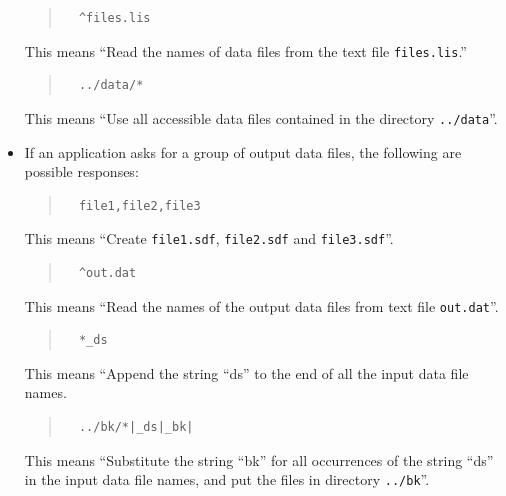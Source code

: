 \documentclass[twoside,11pt]{article}
\renewcommand{\_}{\texttt{\symbol{95}}}
\newenvironment{myquote}{\begin{quote}\begin{small}}{\end{small}\end{quote}}
\begin{document}
\begin{itemize}
\begin{myquote}
\begin{verbatim}
  ^files.lis
\end{verbatim}
\end{myquote}
\vspace{-3mm}
This means ``Read the names of data files from the text file
\verb+files.lis+.''

\begin{myquote}
\begin{verbatim}
  ../data/*
\end{verbatim}
\end{myquote}
\vspace{-3mm}
This means ``Use all accessible data files contained in the directory 
\verb+../data+''.

\item If an application asks for a group of output data files, the following 
are possible responses:

\begin{myquote}
\begin{verbatim}
  file1,file2,file3
\end{verbatim}
\end{myquote}
\vspace{-3mm}
This means ``Create \verb+file1.sdf+, \verb+file2.sdf+ and \verb+file3.sdf+''.

\begin{myquote}
\begin{verbatim}
  ^out.dat
\end{verbatim}
\end{myquote}
\vspace{-3mm}
This means ``Read the names of the output data files from 
text file \verb+out.dat+''.

\begin{myquote}
\begin{verbatim}
  *_ds
\end{verbatim}
\end{myquote}
\vspace{-3mm}
This means ``Append the string ``\_ds'' to the end of all 
                      the input data file names.

\begin{myquote}
\begin{verbatim}
  ../bk/*|_ds|_bk|
\end{verbatim}
\end{myquote}
\vspace{-3mm}
This means ``Substitute the string ``\_bk'' for all  occurrences of the string
``\_ds'' in the  input data file names, and put the files in 
directory \verb+../bk+''.
\end{itemize}
\end{document}
